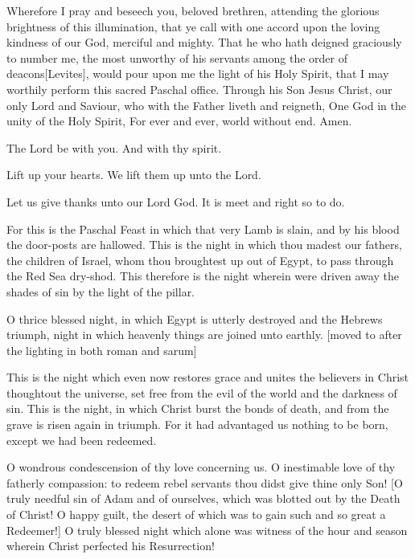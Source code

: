 Wherefore I pray and beseech you, beloved brethren, attending the glorious brightness of this illumination, that ye call with one accord upon the loving kindness of our God, merciful and mighty.  That he who hath deigned graciously to number me, the most unworthy of his servants among the order of deacons[Levites], would pour upon me the light of his Holy Spirit, that I may worthily perform this sacred Paschal office.  Through his Son Jesus Christ, our only Lord and Saviour, who with the Father liveth and reigneth, One God in the unity of the Holy Spirit, For ever and ever, world without end. \R Amen.


\V The Lord be with you.  \R And with thy spirit.

\V Lift up your hearts.  \R We lift them up unto the Lord.

\V Let us give thanks unto our Lord God.  \R It is meet and right so to do.



For this is the Paschal Feast in which that very Lamb is slain, and by his blood the door-posts are hallowed.  This is the night in which thou madest our fathers, the children of Israel, whom thou broughtest up out of Egypt, to pass through the Red Sea dry-shod.  This therefore is the night wherein were driven away the shades of sin by the light of the pillar.

O thrice blessed night, in which Egypt is utterly destroyed and the Hebrews triumph, night in which heavenly things are joined unto earthly. [moved to after the lighting in both roman and sarum]

This is the night which even now restores grace and unites the believers in Christ thoughtout the universe, set free from the evil of the world and the darkness of sin. This is the night, in which Christ burst the bonds of death, and from the grave is risen again in triumph.  For it had advantaged us nothing to be born, except we had been redeemed.

O wondrous condescension of thy love concerning us. O inestimable love of thy fatherly compassion: to redeem rebel servants thou didst give thine only Son! [O truly needful sin of Adam and of ourselves, which was blotted out by the Death of Christ!  O happy guilt, the desert of which was to gain such and so great a Redeemer!] O truly blessed night which alone was witness of the hour and season wherein Christ perfected his Resurrection!

